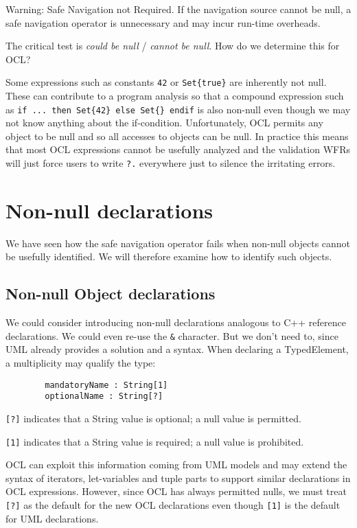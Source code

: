 \documentclass{llncs}
\begin{document}
Warning: Safe Navigation not Required. If the navigation source cannot be null, a safe navigation operator is unnecessary and may incur run-time overheads.

The critical test is \emph{could be null} / \emph{cannot be null}. How do we determine this for OCL?

Some expressions such as constants \verb|42| or \verb|Set{true}| are inherently not null. These can contribute to a program analysis so that a compound expression such as \verb|if ... then Set{42} else Set{} endif| is also non-null even though we may not know anything about the if-condition. Unfortunately, OCL permits any object to be null and so all accesses to objects can be null. In practice this means that most OCL expressions cannot be usefully analyzed and the validation WFRs will just force users to write \verb|?.| everywhere just to silence the irritating errors. 

\section{Non-null declarations}\label{Non-null declarations}

We have seen how the safe navigation operator fails when non-null objects cannot be usefully identified. We will therefore examine how to identify such objects. 

\subsection{Non-null Object declarations}

We could consider introducing non-null declarations analogous to C++ reference declarations. We could even re-use the \verb|&| character. But we don't need to, since UML already provides a solution and a syntax. When declaring a TypedElement, a multiplicity may qualify the type:

\begin{verbatim}
        mandatoryName : String[1]
        optionalName : String[?]
\end{verbatim}

\verb|[?]| indicates that a String value is optional; a null value is permitted.

\verb|[1]| indicates that a String value is required; a null value is prohibited.

OCL can exploit this information coming from UML models and may extend the syntax of iterators, let-variables and tuple parts to support similar declarations in OCL expressions. However, since OCL has always permitted nulls, we must treat \verb|[?]| as the default for the new OCL declarations even though \verb|[1]| is the default for UML declarations.
\end{document}
